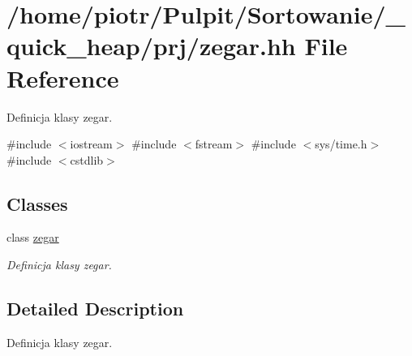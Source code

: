 \hypertarget{zegar_8hh}{\section{/home/piotr/\-Pulpit/\-Sortowanie/\-\_\-quick\-\_\-heap/prj/zegar.hh \-File \-Reference}
\label{zegar_8hh}
}


\-Definicja klasy zegar.  


{\ttfamily \#include $<$iostream$>$}\*
{\ttfamily \#include $<$fstream$>$}\*
{\ttfamily \#include $<$sys/time.\-h$>$}\*
{\ttfamily \#include $<$cstdlib$>$}\*
\subsection*{\-Classes}
\begin{DoxyCompactItemize}
\item 
class \hyperlink{classzegar}{zegar}
\begin{DoxyCompactList}\small\item\em \-Definicja klasy zegar. \end{DoxyCompactList}\end{DoxyCompactItemize}


\subsection{\-Detailed \-Description}
\-Definicja klasy zegar. 